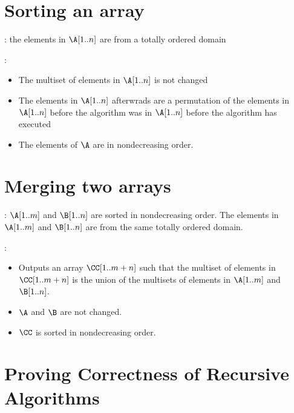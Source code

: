\documentclass[11pt, cyan, night, 0.5in]{hw}
\begin{document}

\section{Sorting an array}

\Precondition: the elements in $\A[1..n]$ are from a totally ordered domain

\Postcondition: 

\begin{itemize}
    \item The multiset of elements in $\A[1..n]$ is not changed
    \item The elements in $\A[1..n]$ afterwrads are a permutation of the elements in $\A[1..n]$ before the algorithm was in $\A[1..n]$ before the algorithm has executed 
    \item The elements of $\A$ are in nondecreasing order.  
\end{itemize}

\section{Merging two arrays}

\Precondition: $\A[1..m]$ and $\B[1..n]$ are sorted in nondecreasing order. The elements in $\A[1..m]$ and $\B[1..n]$ are from the same totally ordered domain.

\Postcondition: 
\begin{itemize}
    \item Outputs an array $\CC[1..m+n]$ such that the multiset of elements in $\CC[1..m+n]$ is the union of the multisets of elements in $\A[1..m]$ and $\B[1..n]$.
    \item $\A$ and $\B$ are not changed. 
    \item $\CC$ is sorted in nondecreasing order. 
\end{itemize} 

\section{Proving Correctness of Recursive Algorithms}
\end{document}
